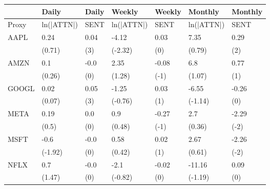 \begin{tabular}{lllllll}
\toprule
{} &       Daily & Daily &      Weekly & Weekly &     Monthly & Monthly \\
\midrule
Proxy &  ln(|ATTN|) &  SENT &  ln(|ATTN|) &   SENT &  ln(|ATTN|) &    SENT \\
AAPL  &        0.24 &  0.04 &       -4.12 &   0.03 &        7.35 &    0.29 \\
      &      (0.71) &   (3) &     (-2.32) &    (0) &      (0.79) &     (2) \\
AMZN  &         0.1 &  -0.0 &        2.35 &  -0.08 &         6.8 &    0.77 \\
      &      (0.26) &   (0) &      (1.28) &   (-1) &      (1.07) &     (1) \\
GOOGL &        0.02 &  0.05 &       -1.25 &   0.03 &       -6.55 &   -0.26 \\
      &      (0.07) &   (3) &     (-0.76) &    (1) &     (-1.14) &     (0) \\
META  &        0.19 &   0.0 &         0.9 &  -0.27 &         2.7 &   -2.29 \\
      &       (0.5) &   (0) &      (0.48) &   (-1) &      (0.36) &    (-2) \\
MSFT  &        -0.6 &  -0.0 &        0.58 &   0.02 &        2.67 &   -2.26 \\
      &     (-1.92) &   (0) &      (0.42) &    (1) &      (0.61) &    (-2) \\
NFLX  &         0.7 &  -0.0 &        -2.1 &  -0.02 &      -11.16 &    0.09 \\
      &      (1.47) &   (0) &     (-0.82) &    (0) &     (-1.19) &     (0) \\
\bottomrule
\end{tabular}
